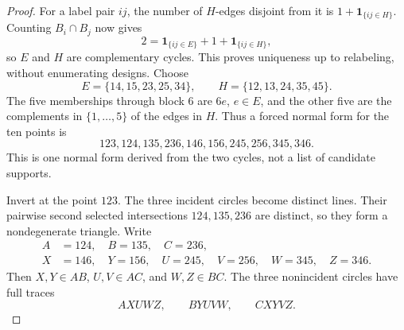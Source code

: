 \documentclass[11pt]{article}
\theoremstyle{definition}
\theoremstyle{remark}
\newcommand{\one}{\mathbf 1}
\begin{document}
\begin{proof}
For a label pair \(ij\), the number of \(H\)-edges disjoint from it is
\(1+\one_{\{ij\in H\}}\).  Counting \(B_i\cap B_j\) now gives
\[
 2=\one_{\{ij\in E\}}+1+\one_{\{ij\in H\}},
\]
so \(E\) and \(H\) are complementary cycles.  This proves uniqueness up to
relabeling, without enumerating designs.  Choose
\[
 E=\{14,15,23,25,34\},\qquad
 H=\{12,13,24,35,45\}.
\]
The five memberships through block \(6\) are \(6e\), \(e\in E\), and the
other five are the complements in \(\{1,\ldots,5\}\) of the edges in \(H\).
Thus a forced normal form for the ten points is
\begin{equation}\label{eq:six-design}
 123,124,135,236,146,156,245,256,345,346.
\end{equation}
This is one normal form derived from the two cycles, not a list of candidate
supports.

Invert at the point \(123\).  The three incident circles become distinct
lines.  Their pairwise second selected intersections \(124,135,236\) are
distinct, so they form a nondegenerate triangle.  Write
\[
\begin{aligned}
 A&=124,\quad B=135,\quad C=236,\\
 X&=146,\quad Y=156,\quad U=245,\quad
 V=256,\quad W=345,\quad Z=346.
\end{aligned}
\]
Then \(X,Y\in AB\), \(U,V\in AC\), and \(W,Z\in BC\).  The three
nonincident circles have full traces
\begin{equation}\label{eq:six-circles}
 AXUWZ,\qquad BYUVW,\qquad CXYVZ.
\end{equation}


\end{proof}
\end{document}
